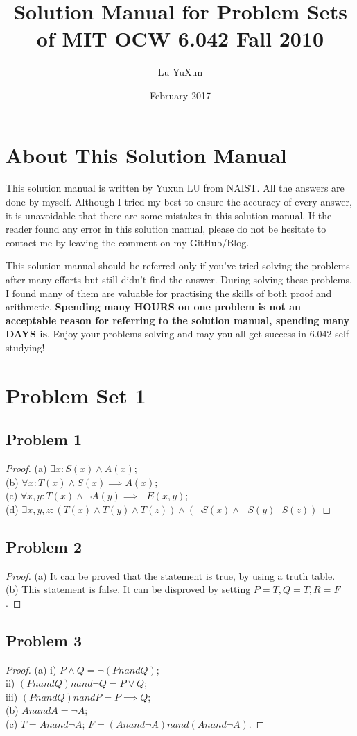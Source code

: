\documentclass{article}
\title{Solution Manual for Problem Sets of MIT OCW 6.042 Fall 2010}
\author{Lu YuXun}
\date{February 2017}
\begin{document}
\maketitle
\section{About This Solution Manual}
This solution manual is written by Yuxun LU from NAIST. All the answers are done by myself. Although I tried my best to ensure the accuracy of every answer, it is unavoidable that there are some mistakes in this solution manual. If the reader found any error in this solution manual, please do not be hesitate to contact me by leaving the comment on my GitHub/Blog.

This solution manual should be referred only if you've tried solving the problems after many efforts but still didn't find the answer. During solving these problems, I found many of them are valuable for practising the skills of both proof and  arithmetic. \textbf{Spending many HOURS on one problem is not an acceptable reason for referring to the solution manual, spending many DAYS is}. Enjoy your problems solving and may you all get success in 6.042 self studying!
\section{Problem Set 1}
\subsection{Problem 1}
\begin{proof}
(a) $\exists x: S(x) \wedge A(x)$;
\\(b) $\forall x: T(x) \wedge S(x) \implies A(x)$;
\\(c) $\forall x,y: T(x) \wedge \neg A(y) \implies \neg E(x,y)$;
\\(d) $\exists x,y,z: ( T(x) \wedge T(y) \wedge T(z) ) \wedge ( \neg S(x) \wedge \neg S(y) \neg S(z) )$
\end{proof}
\subsection{Problem 2}
\begin{proof}
(a) It can be proved that the statement is true, by using a truth table.\\
(b) This statement is false. It can be disproved by setting $P=T, Q=T, R=F$.
\end{proof}
\subsection{Problem 3}
\begin{proof}
(a) i) $P \wedge Q = \neg (P nand Q)$; \\
ii) $(P nand Q) nand \neg Q = P \vee Q$; \\
iii) $(P nand Q) nand P = P \implies Q$; \\
(b) $A nand A = \neg A$; \\
(c) $T = A nand \neg A$; $F = (A nand \neg A) nand (A nand \neg A)$.
\end{proof}
\end{document}
